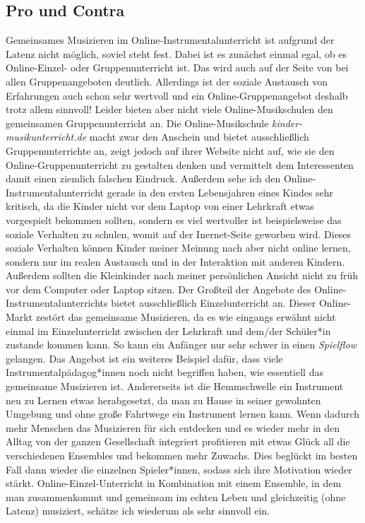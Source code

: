 \subsection{Pro und Contra}
Gemeinsames Musizieren im Online-Instrumentalunterricht ist aufgrund der Latenz
nicht möglich, soviel steht fest. Dabei ist es zunächst einmal egal, ob es
Online-Einzel- oder Gruppenunterricht ist. Das wird auch auf der Seite von
\autocite{online_musikschule_mmo} bei allen Gruppenangeboten deutlich.
Allerdings ist der soziale Austausch von Erfahrungen auch schon sehr wertvoll
und ein Online-Gruppenangebot deshalb trotz allem sinnvoll! Leider bieten aber
nicht viele Online-Musikschulen den gemeinsamen Gruppenunterricht an. Die
Online-Musikschule \emph{kinder-musikunterricht.de} macht zwar den Anschein und
bietet ausschließlich Gruppenunterrichte an, zeigt jedoch auf ihrer Website
nicht auf, wie sie den Online-Gruppenunterricht zu gestalten denken und vermittelt
dem Interessenten damit einen ziemlich falschen Eindruck. Außerdem sehe ich den
Online-Instrumentalunterricht gerade in den ersten Lebensjahren eines Kindes
sehr kritisch, da die Kinder nicht vor dem Laptop von einer Lehrkraft etwas
vorgespielt bekommen sollten, sondern es viel wertvoller ist beispielsweise das
soziale Verhalten zu schulen, womit auf der Inernet-Seite geworben wird. Dieses
soziale Verhalten können Kinder meiner Meinung nach aber nicht online lernen,
sondern nur im realen Austausch und in der Interaktion mit anderen Kindern. 
Außerdem sollten die Kleinkinder nach meiner persönlichen Ansicht nicht zu früh
vor dem Computer oder Laptop sitzen. Der Großteil der Angebote des
Online-Instrumentalunterrichts bietet ausschließlich Einzelunterricht an. 
Dieser Online-Markt zestört das gemeinsame Musizieren, da es wie eingangs
erwähnt nicht einmal im Einzelunterricht zwischen der Lehrkraft und dem/der
Schüler*in zustande kommen kann. So kann ein Anfänger nur sehr schwer in einen
\emph{Spielflow} gelangen. Das Angebot ist ein weiteres Beispiel
dafür, dass viele Instrumentalpädagog*innen noch nicht begriffen haben, wie
essentiell das gemeinsame Musizieren ist. Andererseits ist die Hemmschwelle ein
Instrument neu zu Lernen etwas herabgesetzt, da man zu Hause in seiner gewohnten
Umgebung und ohne große Fahrtwege ein Instrument lernen kann. Wenn dadurch
mehr Menschen das Musizieren für sich entdecken und es wieder mehr in den Alltag
von der ganzen Gesellschaft
integriert profitieren mit etwas Glück all die verschiedenen
Ensembles und bekommen mehr Zuwachs. Dies beglückt im besten Fall dann wieder
die einzelnen Spieler*innen, sodass sich ihre Motivation wieder stärkt.
Online-Einzel-Unterricht in Kombination mit einem Ensemble, in dem man
zusammenkommt und gemeinsam im echten Leben und gleichzeitig (ohne Latenz)
musiziert, schätze ich wiederum als sehr sinnvoll ein. 

